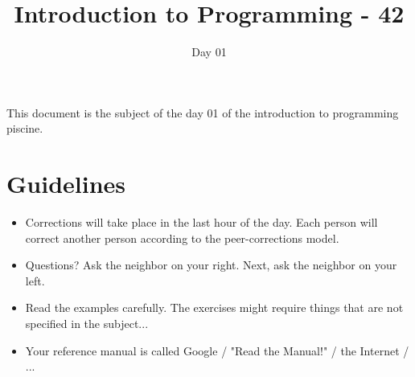 \documentclass{42-en}
\begin{document}
\title{Introduction to Programming - 42}
\subtitle{Day 01}


\summary
{
This document is the subject of the day 01 of the introduction to programming piscine.
}

\maketitle
\tableofcontents



\chapter{Guidelines}

\begin{itemize}

  \item Corrections will take place in the last hour of the day. Each person will correct another person according to the peer-corrections model.
 
  \item Questions? Ask the neighbor on your right. Next, ask the neighbor on your left.
  
  \item Read the examples carefully. The exercises might require things that are not specified in the subject...

  \item Your reference manual is called Google / "Read the Manual!" / the Internet / ...

\end{itemize}

\newpage



\end{document}
